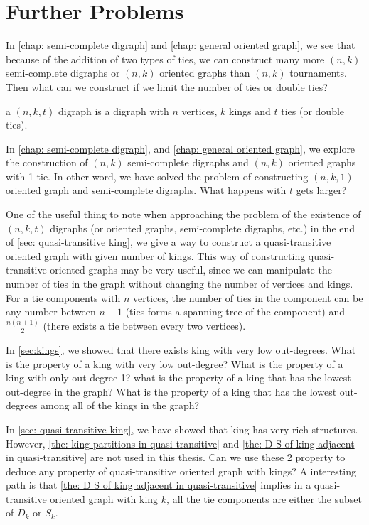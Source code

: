 \chapter{Further Problems}

In \cref{chap: semi-complete digraph} and \cref{chap: general oriented graph},
we see that because of the addition of two types of ties,
we can construct many more \((n, k)\) semi-complete digraphs
or \((n, k)\) oriented graphs than \((n, k)\) tournaments.
Then what can we construct if we limit the number of ties
or double ties?

\begin{definition}
  a \((n, k, t)\) digraph is a digraph with \(n\) vertices,
  \(k\) kings and \(t\) ties (or double ties).
\end{definition}

In \cref{chap: semi-complete digraph}, and \cref{chap: general oriented graph},
we explore the construction of \((n, k)\) semi-complete digraphs
and \((n, k)\) oriented graphs with 1 tie.
In other word, we have solved the problem of constructing
\((n, k, 1)\) oriented graph and semi-complete digraphs.
What happens with \(t\) gets larger?

One of the useful thing to note when approaching the
problem of the existence of \((n, k, t)\) digraphs
(or oriented graphs, semi-complete digraphs, etc.)
in the end of \cref{sec: quasi-transitive king},
we give a way to construct a quasi-transitive oriented graph
with given number of kings.
This way of constructing quasi-transitive oriented graphs
may be very useful,
since we can manipulate the number of ties in the graph
without changing the number of vertices and kings.
For a tie components with \(n\) vertices,
the number of ties in the component can be any number
between \(n - 1\)
(ties forms a spanning tree of the component)
and \(\frac{n(n+1)}{2}\)
(there exists a tie between every two vertices).

In \cref{sec:kings}, we showed that there exists king with very
low out-degrees.
What is the property of a king with very low out-degree?
What is the property of a king with only out-degree 1?
what is the property of a king that has the lowest out-degree
in the graph?
What is the property of a king that has the lowest out-degrees
among all of the kings in the graph?

In \cref{sec: quasi-transitive king},
we have showed that king has very rich structures.
However, \cref{the: king partitions in quasi-transitive}
and \cref{the: D S of king adjacent in quasi-transitive}
are not used in this thesis.
Can we use these 2 property to deduce any property
of quasi-transitive oriented graph with kings?
A interesting path is that
\cref{the: D S of king adjacent in quasi-transitive}
implies in a quasi-transitive oriented graph with king \(k\),
all the tie components are either the subset of \(D_k\) or \(S_k\).

